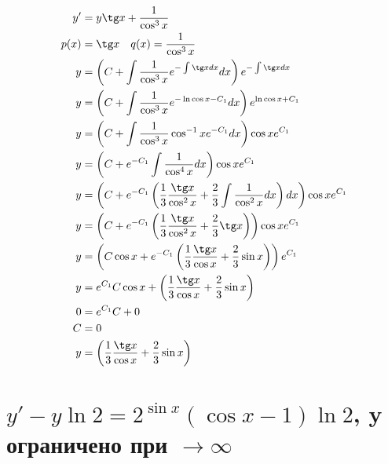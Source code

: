 \begin{align*}
    y'   & = y\tg x + \frac{1}{\cos^3x}                                                                                                          \\
    p(x) & = \tg x \quad q(x) = \frac{1}{\cos^3 x}                                                                                               \\
    y    & = \left( C + \int \frac{1}{\cos^3 x} e^{-\int \tg x dx} dx \right)e^{-\int \tg x dx}                                                  \\
    y    & = \left( C + \int \frac{1}{\cos^3 x} e^{-\ln \cos x - C_1} dx \right)e^{\ln \cos x + C_1}                                             \\
    y    & = \left( C + \int \frac{1}{\cos^3 x} \cos^{-1} x e^{-C_1} dx \right)\cos x e^{C_1}                                                    \\
    y    & = \left( C + e^{-C_1} \int \frac{1}{\cos^4 x} dx \right)\cos x e^{C_1}                                                                \\
    y    & = \left( C + e^{-C_1} \left(\frac{1}{3}\frac{\tg x}{\cos^2 x} + \frac{2}{3} \int \frac{1}{\cos^2 x}dx\right) dx \right)\cos x e^{C_1} \\
    y    & = \left( C + e^{-C_1} \left(\frac{1}{3}\frac{\tg x}{\cos^2 x} + \frac{2}{3} \tg x \right)\right)\cos x e^{C_1}                        \\
    y    & = \left( C \cos x + e^{-C_1} \left(\frac{1}{3}\frac{\tg x}{\cos x} + \frac{2}{3} \sin x \right)\right) e^{C_1}                        \\
    y    & = e^{C_1}C \cos x + \left(\frac{1}{3}\frac{\tg x}{\cos x} + \frac{2}{3} \sin x \right)                                                \\
    0    & = e^{C_1}C + 0                                                                                                                        \\
    C    & = 0                                                                                                                                   \\
    y    & = \left(\frac{1}{3}\frac{\tg x}{\cos x} + \frac{2}{3} \sin x \right)                                                                  \\
\end{align*}

\section{$y'-y\ln 2=2^{\sin x}(\cos x - 1)\ln 2$, y ограничено при $\to\infty$}

